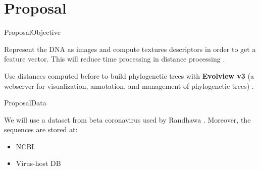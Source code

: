\documentclass[10pt]{beamer}
\newcommand{\1}{
	\setbeamertemplate{background}{
		\texttt{[image: img/1\_dna]}
		\tikz[overlay] \fill[fill opacity=0.75,fill=white] (0,0) rectangle (-\paperwidth,\paperheight);
	}
}
\begin{document}
\section{Proposal}

\begin{frame}{Proposal}{Objective}
	\begin{block}{}
		Represent the DNA as images and compute textures descriptors in order to get a feature vector. This will reduce time processing in distance processing \cite{delibacs2020dna}. 
	\end{block}

	\begin{block}{}
		Use distances computed before to build phylogenetic trees with \textbf{Evolview v3} (a webserver for visualization, annotation, and management of phylogenetic trees) \cite{subramanian2019evolview}.
	\end{block}
\end{frame}

\begin{frame}{Proposal}{Data}
	\begin{block}{}
	We will use a dataset from beta coronavirus used by Randhawa \cite{randhawa2020machine}. Moreover, the sequences are stored at:
	\begin{itemize}
		\item NCBI.
		\item Virus-host DB
	\end{itemize}
	\end{block}
\end{frame}

\end{document}
